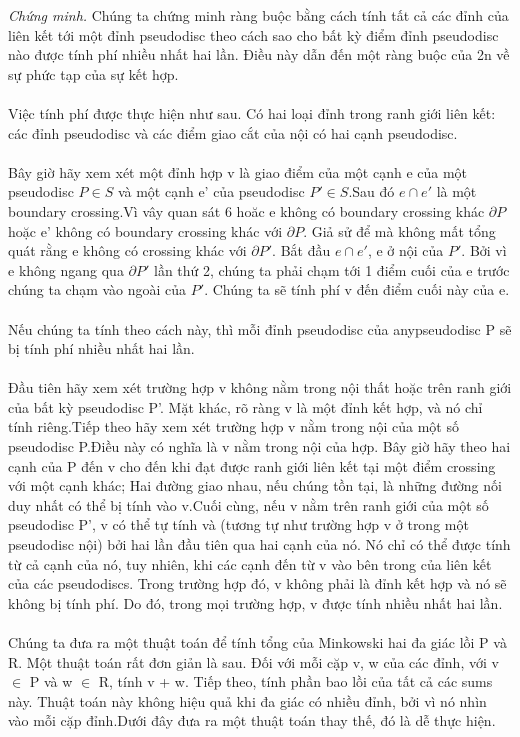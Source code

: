 \documentclass[a4paper,12pt]{report}
\begin{document}
\textit{Chứng minh.} Chúng ta chứng minh ràng buộc bằng cách tính tất cả các đỉnh của liên kết tới một đỉnh pseudodisc theo cách sao cho bất kỳ điểm đỉnh pseudodisc nào được tính phí nhiều nhất hai lần. Điều này dẫn đến một ràng buộc của 2n về sự phức tạp của sự kết hợp. \\ \\
Việc tính phí được thực hiện như sau. Có hai loại đỉnh trong ranh giới liên kết: các đỉnh pseudodisc và các điểm giao cắt của nội có hai cạnh pseudodisc. \\ \\
Bây giờ hãy xem xét một đỉnh hợp v là giao điểm của một cạnh e của một pseudodisc $P \in S$ và một cạnh e' của pseudodisc $P' \in S$.Sau đó $e \cap e'$  là một boundary crossing.Vì vây quan sát 6 hoăc e không có boundary crossing khác $\partial P$ hoặc e' không có boundary crossing khác với $\partial P$. Giả sử để mà không mất tổng quát rằng e không có crossing khác với $\partial P'$. Bắt đầu $e \cap e'$, e ở nội của $P'$. Bởi vì e không ngang qua $\partial P'$ lần thứ 2, chúng ta phải chạm tới 1 điểm cuối của e trước chúng ta chạm vào ngoài của $P'$. Chúng ta sẽ tính phí v đến điểm cuối này của e. \\ \\
Nếu chúng ta tính theo cách này, thì mỗi đỉnh pseudodisc của anypseudodisc P sẽ bị tính phí nhiều nhất hai lần. \\ \\
Đầu tiên hãy xem xét trường hợp v không nằm trong nội thất hoặc trên ranh giới của bất kỳ pseudodisc P'. Mặt khác, rõ ràng v là một đỉnh kết hợp, và nó chỉ tính riêng.Tiếp theo hãy xem xét trường hợp v nằm trong nội của một số pseudodisc P.Điều này có nghĩa là v nằm trong nội của hợp. Bây giờ hãy theo hai cạnh của P đến v cho đến khi đạt được ranh giới liên kết tại một điểm crossing với một cạnh khác; Hai đường giao nhau, nếu chúng tồn tại, là những đường nối duy nhất có thể bị tính vào v.Cuối cùng, nếu v nằm trên ranh giới của một số pseudodisc P', v có thể tự tính và (tương tự như trường hợp v ở trong một pseudodisc nội) bởi hai lần đầu tiên qua hai cạnh của nó. Nó chỉ có thể được tính từ cả cạnh của nó, tuy nhiên, khi các cạnh đến từ v vào bên trong của liên kết của các pseudodiscs. Trong trường hợp đó, v không phải là đỉnh kết hợp và nó sẽ không bị tính phí. Do đó, trong mọi trường hợp, v được tính nhiều nhất hai lần.  \\ \\
Chúng ta đưa ra một thuật toán để tính tổng của Minkowski hai đa giác lồi P và R. Một thuật toán rất đơn giản là sau. Đối với mỗi cặp v, w của các đỉnh, với v $\in$ P và w $\in$ R, tính v + w. Tiếp theo, tính phần bao lồi của tất cả các sums này. Thuật toán này không hiệu quả khi đa giác có nhiều đỉnh, bởi vì nó nhìn vào mỗi cặp đỉnh.Dưới đây đưa ra một thuật toán thay thế, đó là dễ thực hiện.
\end{document}
